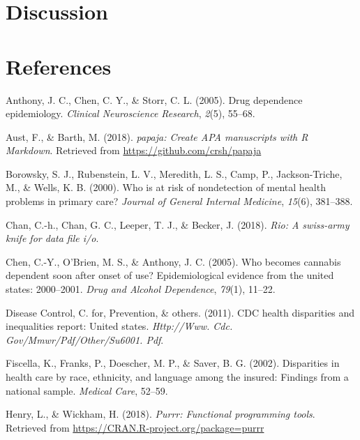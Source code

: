 \documentclass[man]{apa6}
\begin{document}
\section{Discussion}\label{discussion}

\newpage

\section{References}\label{references}

\begingroup
\setlength{\parindent}{-0.5in} \setlength{\leftskip}{0.5in}

\hypertarget{refs}{}
\hypertarget{ref-anthony2005drug}{}
Anthony, J. C., Chen, C. Y., \& Storr, C. L. (2005). Drug dependence
epidemiology. \emph{Clinical Neuroscience Research}, \emph{2}(5),
55--68.

\hypertarget{ref-R-papaja}{}
Aust, F., \& Barth, M. (2018). \emph{papaja: Create APA manuscripts with
R Markdown}. Retrieved from \url{https://github.com/crsh/papaja}

\hypertarget{ref-borowsky2000risk}{}
Borowsky, S. J., Rubenstein, L. V., Meredith, L. S., Camp, P.,
Jackson-Triche, M., \& Wells, K. B. (2000). Who is at risk of
nondetection of mental health problems in primary care? \emph{Journal of
General Internal Medicine}, \emph{15}(6), 381--388.

\hypertarget{ref-R-rio}{}
Chan, C.-h., Chan, G. C., Leeper, T. J., \& Becker, J. (2018).
\emph{Rio: A swiss-army knife for data file i/o}.

\hypertarget{ref-chen2005becomes}{}
Chen, C.-Y., O'Brien, M. S., \& Anthony, J. C. (2005). Who becomes
cannabis dependent soon after onset of use? Epidemiological evidence
from the united states: 2000--2001. \emph{Drug and Alcohol Dependence},
\emph{79}(1), 11--22.

\hypertarget{ref-centers2011cdc}{}
Disease Control, C. for, Prevention, \& others. (2011). CDC health
disparities and inequalities report: United states. \emph{Http://Www.
Cdc. Gov/Mmwr/Pdf/Other/Su6001. Pdf}.

\hypertarget{ref-fiscella2002disparities}{}
Fiscella, K., Franks, P., Doescher, M. P., \& Saver, B. G. (2002).
Disparities in health care by race, ethnicity, and language among the
insured: Findings from a national sample. \emph{Medical Care}, 52--59.

\hypertarget{ref-R-purrr}{}
Henry, L., \& Wickham, H. (2018). \emph{Purrr: Functional programming
tools}. Retrieved from \url{https://CRAN.R-project.org/package=purrr}
\end{document}
